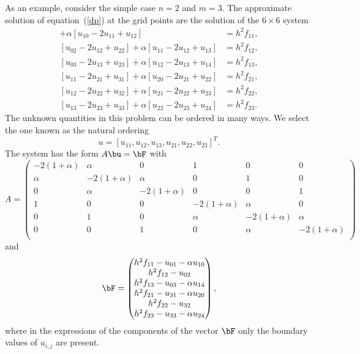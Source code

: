 As an example, consider the simple case $n=2$ and $m=3$.  The
approximate solution of equation~(\ref{dp}) at the grid points are the
solution of the $6\times 6$ system
%
\begin{align*}
  [u_{01}-2u_{11}+u_{21}]+\alpha[u_{10}-2u_{11}+u_{12}] &= h^2 f_{11},\\
  [u_{02}-2u_{12}+u_{22}]+\alpha[u_{11}-2u_{12}+u_{13}] &= h^2 f_{12},\\
  [u_{03}-2u_{13}+u_{23}]+\alpha[u_{12}-2u_{13}+u_{14}] &= h^2 f_{13},\\
  [u_{11}-2u_{21}+u_{31}]+\alpha[u_{20}-2u_{21}+u_{22}] &= h^2 f_{21},\\
  [u_{12}-2u_{22}+u_{32}]+\alpha[u_{21}-2u_{22}+u_{23}] &= h^2 f_{22},\\
  [u_{13}-2u_{23}+u_{33}]+\alpha[u_{22}-2u_{23}+u_{24}] &= h^2 f_{23}.
\end{align*}
%
The unknown quantities in this problem can be ordered in many ways. We
select the one known as the natural ordering
%
\begin{equation*}
  u=[u_{11},u_{12},u_{13},u_{21},u_{22},u_{23}]^T.
\end{equation*}
%
The system has the form $A \bu = \bF$ with
%
\begin{equation}
  A = \begin{pmatrix}
      -2 (1+\alpha) & \alpha & 0 & 1 & 0 & 0 \\
      \alpha & -2(1+\alpha) & \alpha & 0 & 1 & 0 \\
      0 & \alpha & -2(1+\alpha) & 0 & 0 & 1 \\
      1 & 0 & 0 & -2(1+\alpha) & \alpha & 0 \\
      0 & 1 & 0 & \alpha & -2(1+\alpha) & \alpha \\
      0 & 0 & 1 & 0 & \alpha & -2(1+\alpha) \\
    \end{pmatrix} \label{eq:PDE:A}
\end{equation}
%
and
%
\begin{equation*}
  \bF =
  \begin{pmatrix}
    h^2f_{11}- u_{01}-\alpha u_{10} \\
    h^2f_{12}- u_{02} \\
    h^2f_{13}- u_{03}-\alpha u_{14} \\
    h^2f_{21}- u_{31}-\alpha u_{20} \\
    h^2f_{22}- u_{32} \\
    h^2f_{23}- u_{33}-\alpha u_{24}
  \end{pmatrix},
\end{equation*}
%
where in the expressions of the components of the vector $\bF$ only
the boundary values of $u_{i,j}$ are present.

